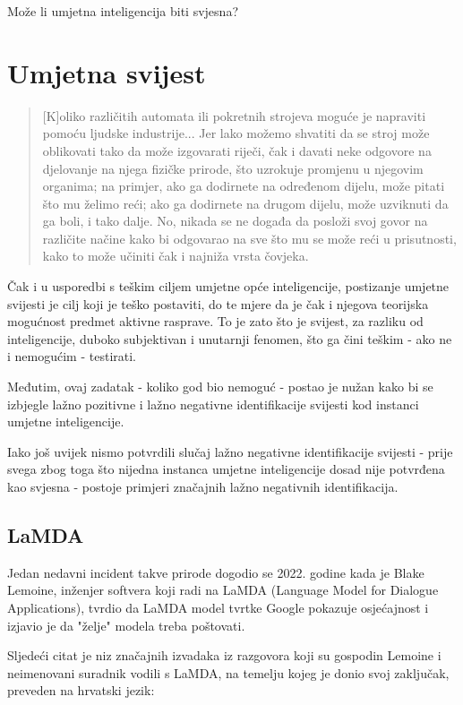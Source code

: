 \documentclass[diplomskirad]{fer}
\begin{document}
\begin{Huge}
Može li umjetna inteligencija biti svjesna?
\end{Huge}

\section{Umjetna svijest}
\begin{quote}
[K]oliko različitih automata ili pokretnih strojeva moguće je napraviti pomoću ljudske industrije... Jer lako možemo shvatiti da se stroj može oblikovati tako da može izgovarati riječi, čak i davati neke odgovore na djelovanje na njega fizičke prirode, što uzrokuje promjenu u njegovim organima; na primjer, ako ga dodirnete na određenom dijelu, može pitati što mu želimo reći; ako ga dodirnete na drugom dijelu, može uzviknuti da ga boli, i tako dalje. No, nikada se ne događa da posloži svoj govor na različite načine kako bi odgovarao na sve što mu se može reći u prisutnosti, kako to može učiniti čak i najniža vrsta čovjeka.
\cite{descartes1}
\end{quote}

Čak i u usporedbi s teškim ciljem umjetne opće inteligencije, postizanje umjetne svijesti je cilj koji je teško postaviti, do te mjere da je čak i njegova teorijska mogućnost predmet aktivne rasprave.
To je zato što je svijest, za razliku od inteligencije, duboko subjektivan i unutarnji fenomen, što ga čini teškim - ako ne i nemogućim - testirati.

Međutim, ovaj zadatak - koliko god bio nemoguć - postao je nužan kako bi se izbjegle lažno pozitivne i lažno negativne identifikacije svijesti kod instanci umjetne inteligencije.

Iako još uvijek nismo potvrdili slučaj lažno negativne identifikacije svijesti - prije svega zbog toga što nijedna instanca umjetne inteligencije dosad nije potvrđena kao svjesna - postoje primjeri značajnih lažno negativnih identifikacija.

\subsection{LaMDA}

Jedan nedavni incident takve prirode dogodio se 2022. godine kada je Blake Lemoine, inženjer softvera koji radi na LaMDA (Language Model for Dialogue Applications), tvrdio da LaMDA model tvrtke Google pokazuje osjećajnost i izjavio je da "želje" modela treba poštovati.

Sljedeći citat je niz značajnih izvadaka iz razgovora koji su gospodin Lemoine i neimenovani suradnik vodili s LaMDA, na temelju kojeg je donio svoj zaključak, preveden na hrvatski jezik:
\end{document}

